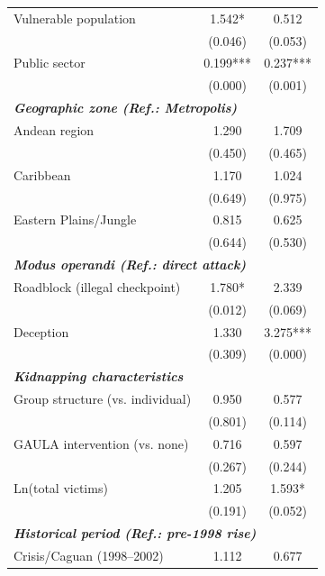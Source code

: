 \documentclass[12pt,a4paper]{article}
\theoremstyle{plain}
\theoremstyle{definition}
\theoremstyle{remark}
\newcommand{\1}{\mathbf{1}}
\begin{document}
{\begin{longtable}{p{}cc}
    Vulnerable population & 1.542* & 0.512 \\
                          & {\scriptsize (0.046)} & {\scriptsize (0.053)} \\
    Public sector & 0.199*** & 0.237*** \\
                  & {\scriptsize (0.000)} & {\scriptsize (0.001)} \\
    \midrule
    \multicolumn{3}{l}{\textbf{\textit{Geographic zone (Ref.: Metropolis)}}} \\
    Andean region & 1.290 & 1.709 \\
                  & {\scriptsize (0.450)} & {\scriptsize (0.465)} \\
    Caribbean & 1.170 & 1.024 \\
              & {\scriptsize (0.649)} & {\scriptsize (0.975)} \\
    Eastern Plains/Jungle & 0.815 & 0.625 \\
                          & {\scriptsize (0.644)} & {\scriptsize (0.530)} \\
    \midrule
    \multicolumn{3}{l}{\textbf{\textit{Modus operandi (Ref.: direct attack)}}} \\
    Roadblock (illegal checkpoint) & 1.780* & 2.339 \\
                                  & {\scriptsize (0.012)} & {\scriptsize (0.069)} \\
    Deception & 1.330 & 3.275*** \\
              & {\scriptsize (0.309)} & {\scriptsize (0.000)} \\
    \midrule
    \multicolumn{3}{l}{\textbf{\textit{Kidnapping characteristics}}} \\
    Group structure (vs. individual) & 0.950 & 0.577 \\
                                    & {\scriptsize (0.801)} & {\scriptsize (0.114)} \\
    GAULA intervention (vs. none) & 0.716 & 0.597 \\
                                 & {\scriptsize (0.267)} & {\scriptsize (0.244)} \\
    Ln(total victims) & 1.205 & 1.593* \\
                      & {\scriptsize (0.191)} & {\scriptsize (0.052)} \\
    \midrule
    \multicolumn{3}{l}{\textbf{\textit{Historical period (Ref.: pre-1998 rise)}}} \\
    Crisis/Caguan (1998--2002) & 1.112 & 0.677 \\

\end{longtable}}
\end{document}
